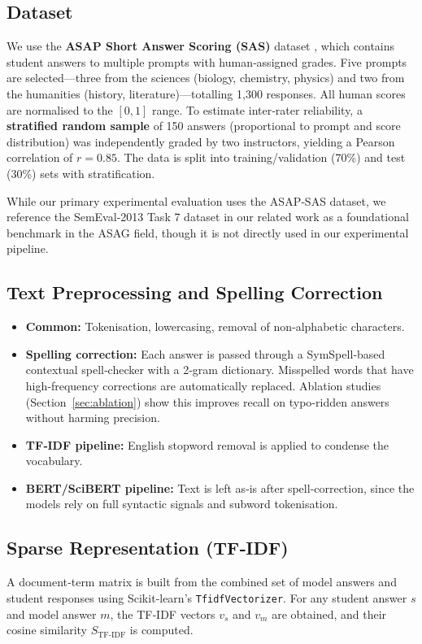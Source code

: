 \documentclass[11pt,a4paper]{article}
\begin{document}
\subsection{Dataset}
\label{sec:dataset}
We use the \textbf{ASAP Short Answer Scoring (SAS)} dataset \cite{hamner2012asap}, which contains student answers to multiple prompts with human‑assigned grades. Five prompts are selected---three from the sciences (biology, chemistry, physics) and two from the humanities (history, literature)---totalling 1,300 responses. All human scores are normalised to the $[0, 1]$ range. To estimate inter‑rater reliability, a \textbf{stratified random sample} of 150 answers (proportional to prompt and score distribution) was independently graded by two instructors, yielding a Pearson correlation of $r = 0.85$. The data is split into training/validation (70\%) and test (30\%) sets with stratification.

While our primary experimental evaluation uses the ASAP‑SAS dataset, we reference the SemEval‑2013 Task 7 dataset \cite{dzikovska2013semeval} in our related work as a foundational benchmark in the ASAG field, though it is not directly used in our experimental pipeline.

\subsection{Text Preprocessing and Spelling Correction}
\label{sec:preprocessing}
\begin{itemize}[noitemsep]
\item \textbf{Common:} Tokenisation, lowercasing, removal of non‑alphabetic characters.
\item \textbf{Spelling correction:} Each answer is passed through a SymSpell‑based contextual spell‑checker with a 2‑gram dictionary. Misspelled words that have high‑frequency corrections are automatically replaced. Ablation studies (Section~\ref{sec:ablation}) show this improves recall on typo‑ridden answers without harming precision.
\item \textbf{TF‑IDF pipeline:} English stopword removal is applied to condense the vocabulary.
\item \textbf{BERT/SciBERT pipeline:} Text is left as‑is after spell‑correction, since the models rely on full syntactic signals and subword tokenisation.
\end{itemize}

\subsection{Sparse Representation (TF‑IDF)}
\label{sec:tfidf}
A document‑term matrix is built from the combined set of model answers and student responses using Scikit‑learn's \texttt{TfidfVectorizer}. For any student answer $s$ and model answer $m$, the TF‑IDF vectors $v_s$ and $v_m$ are obtained, and their cosine similarity $S_{\text{TF‑IDF}}$ is computed.
\end{document}
